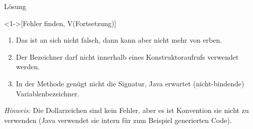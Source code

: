 \begin{frame}[c,fragile]{Lösung}
    \addtocounter{solve}{-1}
    \begin{solve}<1->[Fehler finden, V\hfill{}(Fortsetzung)]
        \begin{enumerate}
            \item Das  ist an sich nicht falsch, dann kann aber  nicht mehr von  erben.
            \item Der Bezeichner  darf nicht innerhalb eines Konstruktoraufrufs verwendet werden.
            \item In der Methode  genügt nicht die Signatur,\pause{} Java erwartet (nicht-bindende) Variablenbezeichner.
        \end{enumerate}
        \pause{}\textit{Hinweis:}\pause{} Die Dollarzeichen sind kein Fehler,\pause{} aber es ist Konvention sie nicht zu verwenden (Java verwendet sie intern für zum Beispiel generierten Code).
    \end{solve}
\end{frame}
\fi